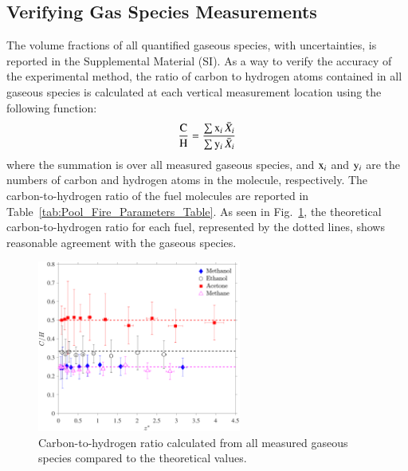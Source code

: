 \documentclass[preprint,review,12pt]{elsarticle}
\begin{document}
\subsection{Verifying Gas Species Measurements}
\label{ssec:Verifying_Vol_Frac_Measurements}
The volume fractions of all quantified gaseous species, with uncertainties, is reported in the Supplemental Material (SI). As a way to verify the accuracy of the experimental method, the ratio of carbon to hydrogen atoms contained in all gaseous species is calculated at each vertical measurement location using the following function:
\begin{equation}\label{eq:c2h_ratio}
  \frac{\rm C}{\rm H}=\frac{ \sum  {\rm x}_i \, \bar{X}_{i} }{ \sum {\rm y}_i \, \bar{X}_{i} }
\end{equation}
where the summation is over all measured gaseous species, and ${\rm x}_i$ and ${\rm y}_i$ are the numbers of carbon and hydrogen atoms in the molecule, respectively. The carbon-to-hydrogen ratio of the fuel molecules are reported in Table~\ref{tab:Pool_Fire_Parameters_Table}. As seen in Fig.~\ref{fig:C2H}, the theoretical carbon-to-hydrogen ratio for each fuel, represented by the dotted lines, shows reasonable agreement with the gaseous species.
\begin{figure}[h!]
	\centering
\includegraphics[width=6.7cm, keepaspectratio]{C2H_ratio_Comparison.pdf}
	\caption[Carbon to hydrogen ratio calculated from all species]{Carbon-to-hydrogen ratio calculated from all measured gaseous species compared to the theoretical values.}
	\label{fig:C2H}
\end{figure}
\end{document}
